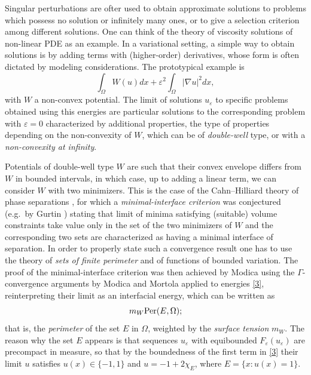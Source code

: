 \documentclass{article}
\newcommand{\e}{\varepsilon}
\begin{document}
\bigskip
Singular perturbations are ofter used to obtain approximate solutions to problems which possess no solution or infinitely many ones, or to give a selection criterion among different solutions. One can think of the theory of viscosity solutions of non-linear PDE as an example. In a variational setting, a simple way to obtain solutions is by adding terms with (higher-order) derivatives, whose form is often dictated by modeling considerations. The prototypical example is
$$
\int_\Omega W(u)dx+\e^2\int_\Omega|\nabla u|^2dx,
$$
with $W$ a non-convex potential. The limit of solutions $u_\e$ to specific problems obtained using this energies are particular solutions to the corresponding problem with $\e=0$ characterized by additional properties, the type of properties depending on the non-convexity of $W$, which can be of {\em double-well} type, or with a {\em non-convexity at infinity}. 

Potentials of double-well type $W$ are such that their convex envelope differs from $W$ in bounded intervals, in which case, up to adding a linear term, we can consider $W$ with two minimizers.  This is the case of the Cahn--Hilliard theory of phase separations \cite{CH}, for which a {\em minimal-interface criterion} was conjectured (e.g.~by Gurtin  \cite{gurtin}) stating that limit of minima satisfying (suitable) volume constraints take value only in the set of the two minimizers of $W$ and the corresponding two sets are characterized as having a minimal interface of separation. In order to properly state such a convergence result one has to use the theory of {\em sets of finite perimeter} and of functions of bounded variation. The proof of the minimal-interface criterion was then achieved by Modica \cite{Modica} using the $\Gamma$-convergence arguments by Modica and Mortola applied to energies \eqref{3}, reinterpreting their limit as an interfacial energy, which can be written as
$$
m_W {\rm Per}(E,\Omega);
$$
that is, the {\em perimeter} of the set $E$ in $\Omega$, weighted by the {\em surface tension} $m_W$. The reason why the set $E$ appears is that sequences $u_\e$ with equibounded $F_\e(u_\e)$ are precompact in measure, so that by the boundedness of the first term in \eqref{3} their limit $u$ satisfies $u(x)\in\{-1,1\}$ and $u=-1+2\chi_E$, where $E=\{x: u(x)=1\}$.
\end{document}
